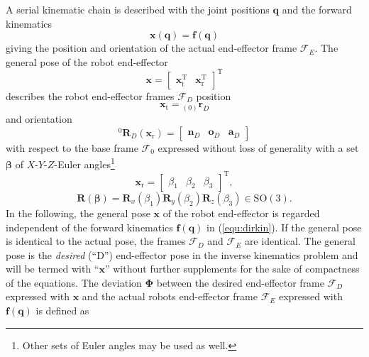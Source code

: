 \documentclass{svproc}
\newcommand{\bm}[1]{\boldsymbol{#1}}
\newcommand{\ortvek}[4]{{ }_{(#1)}{\boldsymbol{#2}}^{#3}_{#4} }
\newcommand{\vek}[3]{\boldsymbol{#1}^{#2}_{#3}}
\newcommand{\rotmat}[2]{{{ }^{#1}\boldsymbol{R}}_{#2}}
\newcommand{\transp}[0]{{\mathrm{T}}}
\newcommand{\ks}[1]{{\mathcal{F}}_{#1}}
\begin{document}
A serial kinematic chain is described with the joint positions $\bm{q}$ and the forward kinematics
%
\begin{equation}
\bm{x} (\bm{q})
=
\bm{f} (\bm{q})
\label{equ:dirkin}
\end{equation}
%
giving the position and orientation of the actual end-effector frame $\ks{E}$.
The general pose of the robot end-effector
%
\begin{equation}
\bm{x}
=
\begin{bmatrix}
\bm{x}_{\mathrm{t}}^\transp & \bm{x}_{\mathrm{r}}^\transp
\end{bmatrix}^\transp
\label{equ:x_def}
\end{equation}
%
describes the robot end-effector frames $\ks{D}$ position 
%
\begin{equation}
\bm{x}_{\mathrm{t}}
=
\ortvek{0}{r}{}{D}
\label{equ:xt_def}
\end{equation}  
%
and orientation 
%
\begin{equation}
\rotmat{0}{D} (\bm{x}_{\mathrm{r}})
=
\begin{bmatrix}\vek{n}{}{D} & \vek{o}{}{D} & \vek{a}{}{D}\end{bmatrix}
\label{equ:xr_def_rotmat}
\end{equation}  
% 
with respect to the base frame $\ks{0}$ expressed without loss of generality with a set $\bm{\beta}$ of $X$-$Y$-$Z$-Euler angles\footnote{Other sets of Euler angles may be used as well.}
%
\begin{equation}
\bm{x}_{\mathrm{r}}
=
\begin{bmatrix}
\beta_1  & \beta_2 & \beta_3
\end{bmatrix}^{\mathrm{T}},
\label{equ:xr_def}
\end{equation} 
%
\begin{equation}
\bm{R}(\bm{\beta}) = \bm{R}_x(\beta_1) \bm{R}_y(\beta_2) \bm{R}_z(\beta_3) \in \mathrm{SO(3)}.
\label{equ:def_rmat_xyz}
\end{equation}
%
In the following, the general pose $\bm{x}$ of the robot end-effector is regarded independent of the forward kinematics $\bm{f}(\bm{q})$ in (\ref{equ:dirkin}).
If the general pose is identical to the actual pose, the frames $\ks{D}$ and $\ks{E}$ are identical.
The general pose is the \emph{desired} (``D'') end-effector pose in the inverse kinematics problem and will be termed with ``$\bm{x}$'' without further supplements for the sake of compactness of the equations.
The deviation $\bm{\Phi}$ between the desired end-effector frame $\ks{D}$ expressed with $\bm{x}$ and the actual robots end-effector frame $\ks{E}$ expressed with $\bm{f}(\bm{q})$ is defined as
\end{document}
